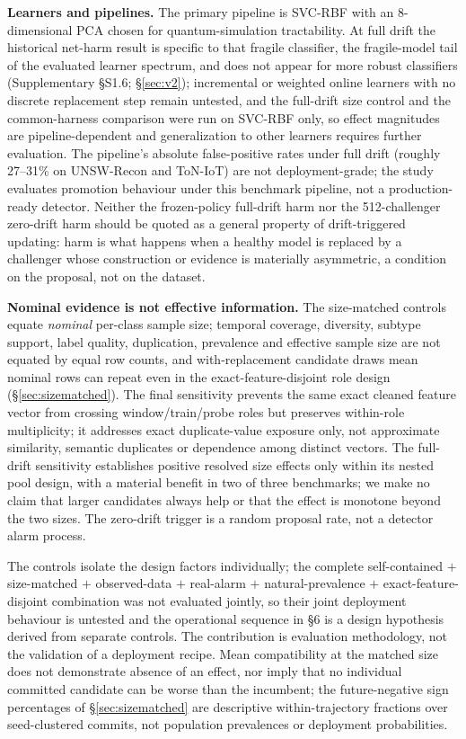 \documentclass[a4paper,fleqn]{cas-sc}
\begin{document}
\textbf{Learners and pipelines.} The primary pipeline is SVC-RBF with an 8-dimensional PCA chosen for quantum-simulation tractability. At full drift the historical net-harm result is specific to that fragile classifier, the fragile-model tail of the evaluated learner spectrum, and does not appear for more robust classifiers (Supplementary \S S1.6; \S\ref{sec:v2}); incremental or weighted online learners with no discrete replacement step remain untested, and the full-drift size control and the common-harness comparison were run on SVC-RBF only, so effect magnitudes are pipeline-dependent and generalization to other learners requires further evaluation. The pipeline's absolute false-positive rates under full drift (roughly 27--31\% on UNSW-Recon and ToN-IoT) are not deployment-grade; the study evaluates promotion behaviour under this benchmark pipeline, not a production-ready detector. Neither the frozen-policy full-drift harm nor the 512-challenger zero-drift harm should be quoted as a general property of drift-triggered updating: harm is what happens when a healthy model is replaced by a challenger whose construction or evidence is materially asymmetric, a condition on the proposal, not on the dataset.

\textbf{Nominal evidence is not effective information.} The size-matched controls equate \emph{nominal} per-class sample size; temporal coverage, diversity, subtype support, label quality, duplication, prevalence and effective sample size are not equated by equal row counts, and with-replacement candidate draws mean nominal rows can repeat even in the exact-feature-disjoint role design (\S\ref{sec:sizematched}). The final sensitivity prevents the same exact cleaned feature vector from crossing window/train/probe roles but preserves within-role multiplicity; it addresses exact duplicate-value exposure only, not approximate similarity, semantic duplicates or dependence among distinct vectors. The full-drift sensitivity establishes positive resolved size effects only within its nested pool design, with a material benefit in two of three benchmarks; we make no claim that larger candidates always help or that the effect is monotone beyond the two sizes. The zero-drift trigger is a random proposal rate, not a detector alarm process.

The controls isolate the design factors individually; the complete self-contained $+$ size-matched $+$ observed-data $+$ real-alarm $+$ natural-prevalence $+$ exact-feature-disjoint combination was not evaluated jointly, so their joint deployment behaviour is untested and the operational sequence in \S6 is a design hypothesis derived from separate controls. The contribution is evaluation methodology, not the validation of a deployment recipe. Mean compatibility at the matched size does not demonstrate absence of an effect, nor imply that no individual committed candidate can be worse than the incumbent; the future-negative sign percentages of \S\ref{sec:sizematched} are descriptive within-trajectory fractions over seed-clustered commits, not population prevalences or deployment probabilities.
\end{document}
